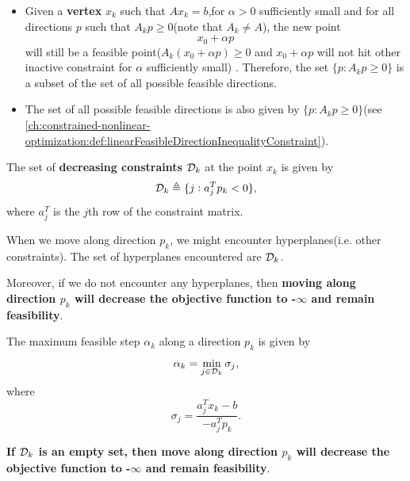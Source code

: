\begin{refsection}
\begin{note}\label{ch:linear-optimization:th:SearchDirectionEqualFeasibleDirectionAtVertex}\hfill
\begin{itemize}
	\item Given a \textbf{vertex} $x_k$ such that $Ax_k = b$,for $\alpha > 0$ sufficiently small and for all directions $p$ such that $A_kp \geq 0$(note that $A_k \neq A$), the new point
	$$x_0 + \alpha p$$
	will still be a feasible point($A_k(x_0 + \alpha p)\geq 0$ and $x_0 + \alpha p$ will not hit other inactive constraint for $\alpha$ sufficiently small)  
	. Therefore, the set $\{p: A_kp \geq 0\}$ is a subset of the set of all possible feasible directions. 
	\item The set of all possible feasible directions is also given by $\{p: A_kp \geq 0\}$(see \autoref{ch:constrained-nonlinear-optimization:def:linearFeasibleDirectionInequalityConstraint}). 
\end{itemize}

\end{note}



\begin{definition}
	The set of \textbf{decreasing constraints} $\mathcal{D}_k$ at the point $x_k$ is given by
	$$\mathcal{D}_k \triangleq \{j: a_j^Tp_k < 0\},$$
	where $a_j^T$ is the $j$th row of the constraint matrix.
\end{definition}

\begin{remark}
	When we move along direction $p_k$, we might encounter hyperplanes(i.e. other constraints). The set of hyperplanes encountered are $\mathcal{D}_k$. 
	
	Moreover, if we do not encounter any hyperplanes, then \textbf{moving along direction $p_k$ will decrease the objective function to -$\infty$ and remain feasibility}.
\end{remark}


\begin{definition}
	The maximum feasible step $\alpha_k$ along a direction $p_k$ is given by
	$$\alpha_k = \min_{j\in \mathcal{D}_k} \sigma_j,$$
	where
	$$\sigma_j = \frac{a^T_jx_k - b}{-a^T_jp_k}.$$
	
	\textbf{If $\mathcal{D}_k$ is an empty set, then move along direction $p_k$ will decrease the objective function to -$\infty$ and remain feasibility}.
\end{definition}


\end{refsection}
